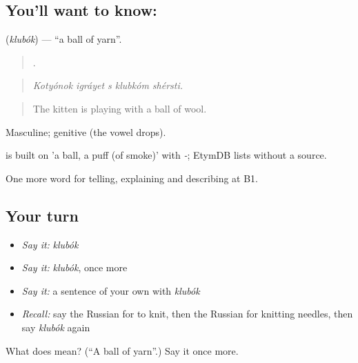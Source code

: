 \subsection*{You'll want to know: }
\textbf{} (\emph{klubók}) — \textquotedblleft{}a ball of yarn\textquotedblright{}.

\begin{quote}
    .
\end{quote}

\begin{quote}
\emph{Kotyónok igráyet s klubkóm shérsti.}
\end{quote}

\begin{quote}
The kitten is playing with a ball of wool.
\end{quote}

Masculine; genitive  (the vowel drops).

\begin{cousinweb}
\emph{} is built on \emph{} 'a ball, a puff (of smoke)' with \emph{-}; EtymDB lists \emph{} without a source.
\end{cousinweb}

\begin{grammarlens}[title={What you've built}]
One more word for telling, explaining and describing at B1.
\end{grammarlens}

\subsection*{Your turn}
\begin{itemize}
\raggedright
  \item \emph{Say it:} \emph{klubók}
  \item \emph{Say it:} \emph{klubók}, once more
  \item \emph{Say it:} a sentence of your own with \emph{klubók}
  \item \emph{Recall:} say the Russian for to knit, then the Russian for knitting needles, then say \emph{klubók} again
\end{itemize}

\begin{tcolorbox}[breakable,colback=teal!4,colframe=teal!35!black,title={Before you move on}]
What does  mean? (\textquotedblleft{}A ball of yarn\textquotedblright{}.) Say it once more.
\end{tcolorbox}

